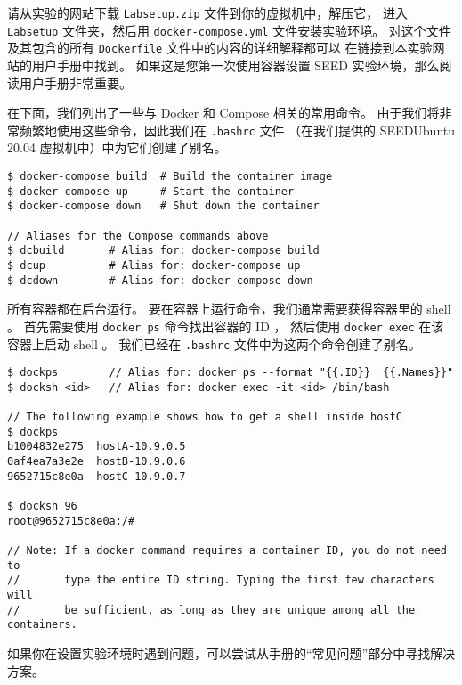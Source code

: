 请从实验的网站下载 \texttt{Labsetup.zip} 文件到你的虚拟机中，解压它，
进入 \texttt{Labsetup} 文件夹，然后用 \texttt{docker-compose.yml} 文件安装实验环境。
对这个文件及其包含的所有 \texttt{Dockerfile} 文件中的内容的详细解释都可以
在链接到本实验网站的用户手册中找到。
如果这是您第一次使用容器设置 SEED 实验环境，那么阅读用户手册非常重要。

在下面，我们列出了一些与 Docker 和 Compose 相关的常用命令。
由于我们将非常频繁地使用这些命令，因此我们在 \texttt{.bashrc} 文件
（在我们提供的 SEEDUbuntu 20.04 虚拟机中）中为它们创建了别名。


\begin{lstlisting}
$ docker-compose build  # Build the container image
$ docker-compose up     # Start the container
$ docker-compose down   # Shut down the container

// Aliases for the Compose commands above
$ dcbuild       # Alias for: docker-compose build
$ dcup          # Alias for: docker-compose up
$ dcdown        # Alias for: docker-compose down
\end{lstlisting}


所有容器都在后台运行。
要在容器上运行命令，我们通常需要获得容器里的 shell 。
首先需要使用 \texttt{docker ps} 命令找出容器的 ID ，
然后使用 \texttt{docker exec} 在该容器上启动 shell 。
我们已经在 \texttt{.bashrc} 文件中为这两个命令创建了别名。

\begin{lstlisting}
$ dockps        // Alias for: docker ps --format "{{.ID}}  {{.Names}}"
$ docksh <id>   // Alias for: docker exec -it <id> /bin/bash

// The following example shows how to get a shell inside hostC
$ dockps
b1004832e275  hostA-10.9.0.5
0af4ea7a3e2e  hostB-10.9.0.6
9652715c8e0a  hostC-10.9.0.7

$ docksh 96
root@9652715c8e0a:/#

// Note: If a docker command requires a container ID, you do not need to
//       type the entire ID string. Typing the first few characters will
//       be sufficient, as long as they are unique among all the containers.
\end{lstlisting}


如果你在设置实验环境时遇到问题，可以尝试从手册的``常见问题''部分中寻找解决方案。
